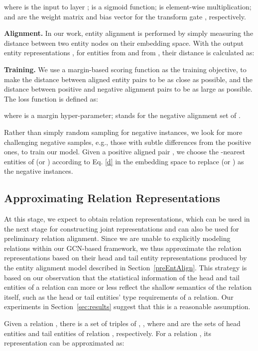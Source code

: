 \documentclass[11pt,a4paper]{article}
\newcommand\cparagraph[1]{\vspace{1mm}\noindent\textbf{#1.}}
\begin{document}
where  is the input to layer ;  is a sigmoid function;  is element-wise multiplication;  and  are the weight matrix and bias vector for the transform gate ,
respectively.


\cparagraph{Alignment\label{prediction}} In our work, entity alignment is performed by simply measuring the distance between two entity nodes on their embedding space.
With the output entity representations
, for entities  from  and  from , their distance is
calculated as:


\cparagraph{Training} 
We use a margin-based scoring function as the training objective, to make the distance between aligned entity pairs to be as close as possible, and the distance between positive and negative alignment pairs to be as large as possible. The loss function is defined as:

where  is a margin hyper-parameter;  stands for the negative alignment set of .

Rather than simply random sampling for negative instances, we look for more challenging negative samples, e.g., those with subtle differences from the positive ones, to train our model.
Given a positive aligned pair ,  we choose the -nearest
entities of  (or ) according to Eq. \ref{d} in the embedding space to replace  (or ) as the negative instances. 

\subsection{Approximating Relation Representations}
\label{subsection:relationAlign}
At this stage, we expect to obtain relation representations, which can be used in the next stage for constructing joint representations and can also be used for preliminary relation alignment.
Since we are unable to explicitly modeling relations within our GCN-based framework, we thus approximate the relation representations based
on their head and tail entity representations produced by the entity alignment model described in Section~\ref{preEntAlign}. This strategy is
based on our observation that the statistical information of the head and tail entities of a relation can more or less reflect the shallow
semantics of the relation itself, such as the head or tail entities' type requirements of a relation. Our experiments in Section~\ref{sec:results} suggest that
this is a reasonable assumption.

Given a relation , there is a set of triples of , , where  and  are the sets of head entities and tail entities of relation , respectively. For a relation , its representation can be approximated as:
\end{document}

